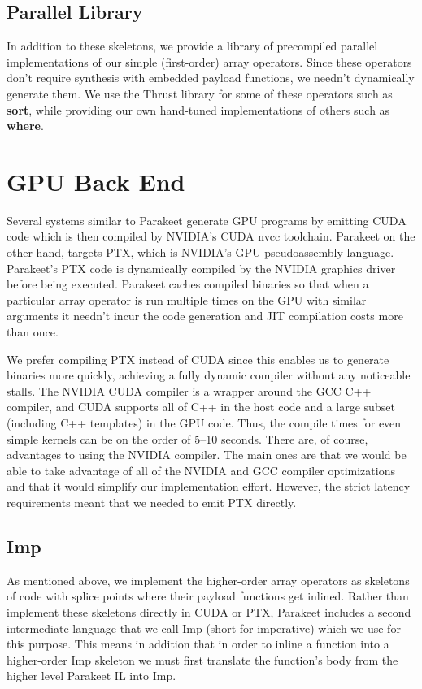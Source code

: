 \documentclass[preprint]{sigplanconf}
\begin{document}
\subsection{Parallel Library}

In addition to these skeletons, we provide a library of precompiled parallel implementations of our simple (first-order) array operators. Since these operators don't require synthesis with embedded payload functions, we needn't dynamically generate them.  We use the Thrust library \cite{Hobe10} for some of these operators such as \textbf{sort}, while providing our own hand-tuned implementations of others such as \textbf{where}.

\section{GPU Back End}
Several systems similar to Parakeet \cite{Cata10,Chaf11} generate GPU programs by emitting CUDA code which is then compiled by NVIDIA's CUDA nvcc toolchain. Parakeet on the other hand, targets PTX, which is NVIDIA's GPU pseudoassembly language. Parakeet's PTX code is dynamically compiled by the NVIDIA graphics driver before being executed.  Parakeet caches compiled binaries so that when a particular array operator is run multiple times on the GPU with similar arguments it needn't incur the code generation and JIT compilation costs more than once.

We prefer compiling PTX instead of CUDA since this enables us to generate binaries more quickly, achieving a fully dynamic compiler without any noticeable stalls. The NVIDIA CUDA compiler is a wrapper around the GCC C++ compiler, and CUDA supports all of C++ in the host code and a large subset (including C++ templates) in the GPU code.  Thus, the compile times for even simple kernels can be on the order of 5--10 seconds.  There are, of course, advantages to using the NVIDIA compiler. The main ones are that we would be able to take advantage of all of the NVIDIA and GCC compiler optimizations and that it would simplify our implementation effort.  However, the strict latency requirements meant that we needed to emit PTX directly.

\subsection{Imp}
\label{Imp}
As mentioned above, we implement the higher-order array operators as skeletons of code with splice points where their payload functions get inlined.  Rather than implement these skeletons directly in CUDA or PTX, Parakeet includes a second intermediate language that we call Imp (short for imperative) which we use for this purpose.  This means in addition that in order to inline a function into a higher-order Imp skeleton we must first translate the function's body from the higher level Parakeet IL into Imp.
\end{document}

